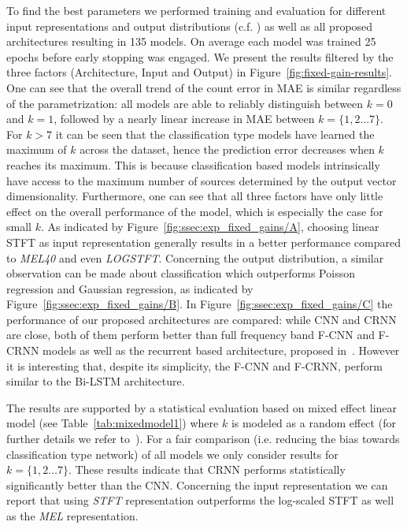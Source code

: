 To find the best parameters we performed training and evaluation for different input representations and output distributions (c.f. \cite{stoeter17}) as well as all proposed architectures resulting in 135 models.
On average each model was trained 25 epochs before early stopping was engaged.
We present the results filtered by the three factors (Architecture, Input and Output) in Figure~\ref{fig:fixed-gain-results}.
One can see that the overall trend of the count error in MAE is similar regardless of the parametrization: all models are able to reliably distinguish between \(k=0\) and \(k=1\), followed by a nearly linear increase in MAE between \(k=\{1, 2\dots7\}\).
For \(k > 7\) it can be seen that the classification type models have learned the maximum of \(k\) across the dataset, hence the prediction error decreases when \(k\) reaches its maximum.
This is because classification based models intrinsically have access to the maximum number of sources determined by the output vector dimensionality.
Furthermore, one can see that all three factors have only little effect on the overall performance of the model, which is especially the case for small \(k\).
As indicated by Figure~\ref{fig:ssec:exp_fixed_gains/A}, choosing linear STFT as input representation generally results in a better performance compared to \emph{MEL40} and even \emph{LOGSTFT}.
Concerning the output distribution, a similar observation can be made about classification which outperforms Poisson regression and Gaussian regression, as indicated by Figure~\ref{fig:ssec:exp_fixed_gains/B}.
In Figure~\ref{fig:ssec:exp_fixed_gains/C} the performance of our proposed architectures are compared:
while CNN and CRNN are close, both of them perform better than full frequency band F-CNN and F-CRNN models as well as the recurrent based architecture, proposed in~\cite{stoeter17}.
However it is interesting that, despite its simplicity, the F-CNN and F-CRNN, perform similar to the Bi-LSTM architecture.
\par
The results are supported by a statistical evaluation based on mixed effect linear model (see Table~\ref{tab:mixedmodel1}) where \(k\) is modeled as a random effect (for further details we refer to~\cite{Mcculloch06}).
For a fair comparison (i.e. reducing the bias towards classification type network) of all models we only consider results for \(k = \{1, 2\dots7\}\).
These results indicate that CRNN performs statistically significantly better than the CNN.\@
Concerning the input representation we can report that using \emph{STFT} representation outperforms the log-scaled STFT as well as the \emph{MEL} representation.
